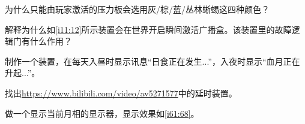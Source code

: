 \begin{problemset}
\item 为什么只能由玩家激活的压力板会选用灰/棕/蓝/丛林蜥蜴这四种颜色？
\item 解释为什么如\autoref{i11:12}所示装置会在世界开启瞬间激活广播盒。该装置里的故障逻辑门有什么作用？
\begin{figure}[h]
\begin{center}
\end{center}
\caption{}
\label{i11:12}
\end{figure}
\item 制作一个装置，在每天入昼时显示讯息“日食正在发生...”，入夜时显示“血月正在升起...”。
\item 找出\url{https://www.bilibili.com/video/av5271577}中的延时装置。
\item 做一个显示当前月相的显示器，显示效果如\autoref{i61:68}。
\begin{figure}[h]
\begin{center}
\end{center}
\end{figure}
\end{problemset}
